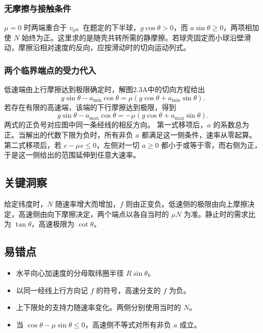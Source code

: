 \documentclass[UTF8,fontset=fandol,a4paper,11pt]{ctexart}
\begin{document}
\subsubsection*{无摩擦与接触条件}
$\mu=0$ 时两端重合于 $v_0$。在题定的下半球，$g\cos\theta>0$，而 $a\sin\theta\geq0$，两项相加使 $N$ 始终为正。这里求的是随壳共转所需的静摩擦。若球壳固定而小球沿壁滑动，摩擦沿相对速度的反向，应按滑动时的切向运动列式。
\subsubsection*{两个临界端点的受力代入}
低速端由上行摩擦达到极限确定时，解图2.3A中的切向方程给出
\[
g\sin\theta-a_{\min}\cos\theta
=\mu(g\cos\theta+a_{\min}\sin\theta).
\]
若存在有限的高速端，该端的下行摩擦达到极限，得到
\[
g\sin\theta-a_{\max}\cos\theta
=-\mu(g\cos\theta+a_{\max}\sin\theta).
\]
两式的正负号对应图中同一条经线的相反方向。
第一式移项后，$a$ 的系数总为正。当解出的代数下限为负时，所有非负 $a$ 都满足这一侧条件，速率从零起算。第二式移项后，若 $c-\mu s\leq0$，左侧对一切 $a\geq0$ 都小于或等于零，而右侧为正，于是这一侧给出的范围延伸到任意大速率。




\subsection*{关键洞察}

给定纬度时，$N$ 随速率增大而增加，$f$ 则由正变负。低速侧的极限由向上摩擦决定，高速侧由向下摩擦决定，两个端点以各自当时的 $\mu N$ 为准。静止时的需求比为 $\tan\theta$，高速极限为 $\cot\theta$。



\subsection*{易错点}

\begin{itemize}
\item 水平向心加速度的分母取纬圈半径 $R\sin\theta$。
\item 以同一经线上行方向记 $f$ 的符号，高速分支的 $f$ 为负。
\item 上下限处的支持力随速率变化。两侧分别使用当时的 $N$。
\item 当 $\cos\theta-\mu\sin\theta\leq0$，高速侧不等式对所有非负 $a$ 成立。
\end{itemize}
\end{document}
